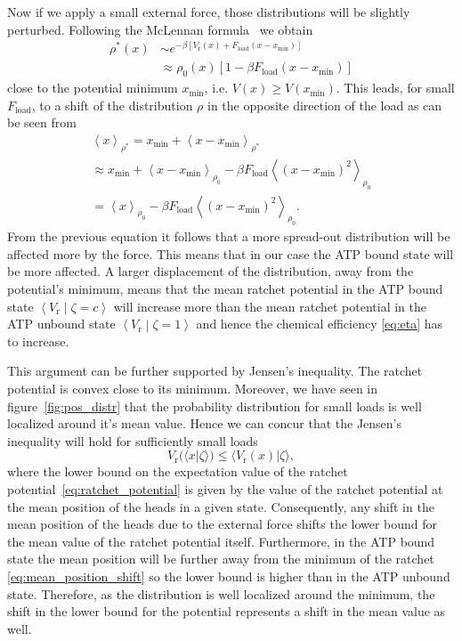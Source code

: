 \documentclass[aps,pre,twocolumn,showpacs,showkeys,superscriptaddress,floatfix]{revtex4-1}
\begin{document}
Now if we apply a small external force, those distributions will be slightly perturbed. 
Following the McLennan formula~\cite{Maes2010} we obtain  
\begin{align*}
\rho^*(x) 
&\sim e^{-\beta \left[V_\text{r}(x) + F_\text{load} \left( x - x_\text{min} \right) \right]} \\
&\approx \rho_0(x) \left[1 - \beta F_\text{load} \left( x - x_\text{min} \right) \right]
\end{align*}
close to the potential minimum $x_\text{min}$, i.e. $V(x) \ge V(x_\text{min})$. 
This leads, for small $F_\text{load}$, to a shift of the distribution $\rho$ in the opposite direction of the load
as can be seen from 
\begin{multline}
\left\langle x \right\rangle_{\rho^*} 
= x_\text{min} + \left\langle x - x_\text{min} \right\rangle_{\rho^*}
\\
\approx x_\text{min} + \left\langle x - x_\text{min} \right\rangle_{\rho_0} 
- \beta F_\text{load} \left\langle \left( x - x_\text{min} \right)^2 \right\rangle_{\rho_0} 
\\
= \left\langle x \right\rangle_{\rho_0}
- \beta F_\text{load} \left\langle \left( x - x_\text{min} \right)^2 \right\rangle_{\rho_0} .
\label{eq:mean_position_shift}
\end{multline}
From the previous equation it follows that a more spread-out distribution will be affected more by the force.
This means that in our case the ATP bound state will be more affected.
A larger displacement of the distribution, away from the potential's minimum, 
means that the mean ratchet potential in the ATP bound state $\left\langle V_\text{r} \middle| \zeta = c \right\rangle$ will increase more than the mean ratchet potential in the ATP unbound state $\left\langle V_\text{r} \middle| \zeta = 1 \right\rangle$ and hence the chemical efficiency \eqref{eq:eta} has to increase. 

This argument can be further supported by Jensen's inequality.
The ratchet potential is convex close to its minimum. 
Moreover, we have seen in figure~\ref{fig:pos_distr} that the probability distribution for small loads is well localized around it's mean value.
Hence we can concur that the Jensen's inequality will hold for sufficiently small loads  
\begin{equation*}
V_\text{r}(\langle x | \zeta \rangle) \leq \langle V_\text{r}(x) | \zeta \rangle , 
\end{equation*} 
where the lower bound on the expectation value of the ratchet potential~\eqref{eq:ratchet_potential} is given by the value of the ratchet potential at the mean position of the heads in a given state. 
Consequently, any shift in the mean position of the heads due to the external force shifts the lower bound for the mean value of the ratchet potential itself.
Furthermore, in the ATP bound state the mean position will be further away from the minimum of the ratchet \eqref{eq:mean_position_shift} so the lower bound is higher than in the ATP unbound state.
Therefore, as the distribution is well localized around the minimum, the shift in the lower bound for the potential represents a shift in the mean value as well. 
\end{document}
